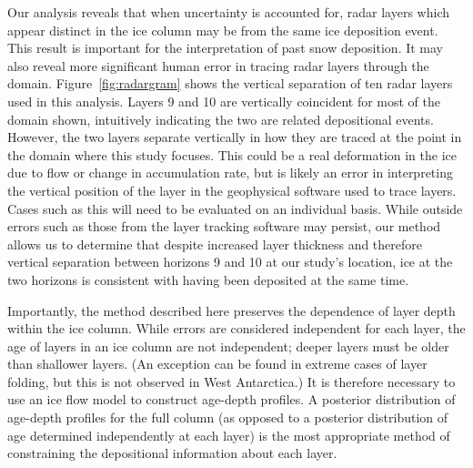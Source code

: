 \documentclass[12pt]{article}
\begin{document}
Our analysis reveals that when uncertainty is accounted for, radar layers which appear distinct in the ice column may be from the same ice deposition event. This result is important for the interpretation of past snow deposition. It may also reveal more significant human error in tracing radar layers through the domain. Figure~\ref{fig:radargram} shows the vertical separation of ten radar layers used in this analysis. Layers 9 and 10 are vertically coincident for most of the domain shown, intuitively indicating the two are related depositional events. However, the two layers separate vertically in how they are traced at the point in the domain where this study focuses. This could be a real deformation in the ice due to flow or change in accumulation rate, but is likely an error in interpreting the vertical position of the layer in the geophysical software used to trace layers. Cases such as this will need to be evaluated on an individual basis. While outside errors such as those from the layer tracking software may persist, our method allows us to determine that despite increased layer thickness and therefore vertical separation between horizons 9 and 10 at our study's location, ice at the two horizons is consistent with having been deposited at the same time.

Importantly, the method described here preserves the dependence of layer depth within the ice column. While errors are considered independent for each layer, the age of layers in an ice column are not independent; deeper layers must be older than shallower layers. (An exception can be found in extreme cases of layer folding, but this is not observed in West Antarctica.) It is therefore necessary to use an ice flow model to construct age-depth profiles. A posterior distribution of age-depth profiles for the full column (as opposed to a posterior distribution of age determined independently at each layer) is the most appropriate method of constraining the depositional information about each layer. 



\end{document}
